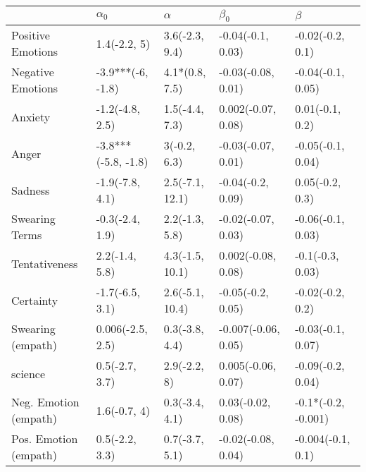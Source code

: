 \begin{tabular}{lllll}
\toprule
{} &           $\alpha_0$ &         $\alpha$ &            $\beta_0$ &              $\beta$ \\
\midrule
Positive Emotions     &         1.4(-2.2, 5) &   3.6(-2.3, 9.4) &    -0.04(-0.1, 0.03) &     -0.02(-0.2, 0.1) \\
Negative Emotions     &    -3.9***(-6, -1.8) &   4.1*(0.8, 7.5) &   -0.03(-0.08, 0.01) &    -0.04(-0.1, 0.05) \\
Anxiety               &      -1.2(-4.8, 2.5) &   1.5(-4.4, 7.3) &   0.002(-0.07, 0.08) &      0.01(-0.1, 0.2) \\
Anger                 &  -3.8***(-5.8, -1.8) &     3(-0.2, 6.3) &   -0.03(-0.07, 0.01) &    -0.05(-0.1, 0.04) \\
Sadness               &      -1.9(-7.8, 4.1) &  2.5(-7.1, 12.1) &    -0.04(-0.2, 0.09) &      0.05(-0.2, 0.3) \\
Swearing Terms        &      -0.3(-2.4, 1.9) &   2.2(-1.3, 5.8) &   -0.02(-0.07, 0.03) &    -0.06(-0.1, 0.03) \\
Tentativeness         &       2.2(-1.4, 5.8) &  4.3(-1.5, 10.1) &   0.002(-0.08, 0.08) &     -0.1(-0.3, 0.03) \\
Certainty             &      -1.7(-6.5, 3.1) &  2.6(-5.1, 10.4) &    -0.05(-0.2, 0.05) &     -0.02(-0.2, 0.2) \\
Swearing (empath)     &     0.006(-2.5, 2.5) &   0.3(-3.8, 4.4) &  -0.007(-0.06, 0.05) &    -0.03(-0.1, 0.07) \\
science               &       0.5(-2.7, 3.7) &     2.9(-2.2, 8) &   0.005(-0.06, 0.07) &    -0.09(-0.2, 0.04) \\
Neg. Emotion (empath) &         1.6(-0.7, 4) &   0.3(-3.4, 4.1) &    0.03(-0.02, 0.08) &  -0.1*(-0.2, -0.001) \\
Pos. Emotion (empath) &       0.5(-2.2, 3.3) &   0.7(-3.7, 5.1) &   -0.02(-0.08, 0.04) &    -0.004(-0.1, 0.1) \\
\bottomrule
\end{tabular}
